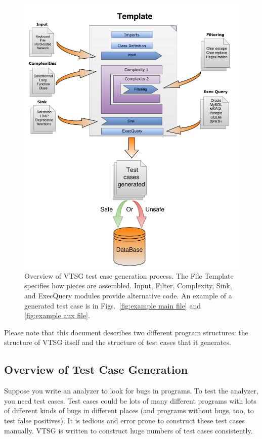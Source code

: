 \begin{figure}[htbp]
  \includegraphics[width=1\linewidth]{fig_VTSG_overview.png}
  \caption{Overview of VTSG test case generation process. The File Template
  specifies how pieces are assembled. Input, Filter, Complexity,
  Sink, and ExecQuery modules provide alternative code.  
  An example of
  a generated test case is in 
  Figs.~\ref{fig:example main file} and 
  \ref{fig:example aux file}.}
  \label{fig:VTS operation overview}
\end{figure}

Please note that this document describes two different program structures: the
structure of VTSG itself and the structure of test cases that it generates.

\subsection{Overview of Test Case Generation}

Suppose you write an analyzer to look for bugs in programs.  To test the
analyzer, you need test cases.  Test cases could be lots of many different
programs with lots of different kinds of bugs in different places (and programs
without bugs, too, to test false positives).  It is tedious and error prone to
construct these test cases manually.  VTSG is written to construct huge numbers
of test cases consistently.

